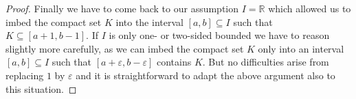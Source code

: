 \documentclass[11pt,a4paper]{article}%
\def\comment#1{\marginpar{\raggedright\scriptsize{\textcolor{purple}{#1}}}}
\def\E{{\mathbb E}}
\def\P{{\mathbb P}}
\def\R{{\mathbb R}}
\renewcommand{\subset}{\subseteq}
\newtheorem{lemma}[theorem]{Lemma}
\renewcommand{\epsilon}{\varepsilon}
\numberwithin{equation}{section}
\begin{document}
\begin{proof}
Finally we have to come back to our assumption $I=\R$ which allowed us to imbed the compact set $K$ into the interval $[a,b] \subset I$ such that $ K \subset [a+1,b-1]$. If $I$ is only one- or two-sided bounded we have to reason slightly more carefully, as we can imbed the compact set $K$ only into an interval $[a,b] \subset I$ such that $[a + \epsilon,b- \epsilon]$ contains $K$. But no difficulties arise from replacing $1$ by $\epsilon$ and it is straightforward to adapt the above argument also to this situation.
\end{proof}












\end{document}
